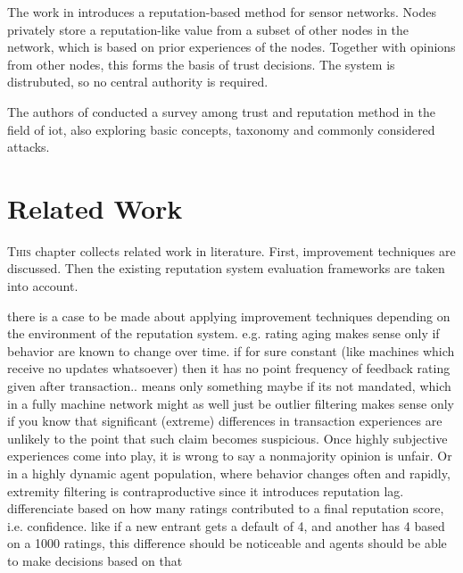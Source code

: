 \documentclass[%
    ]{\PathToTumTemplate/thesis/tum_thesis}
\begin{document}
The work in \cite{ganeriwal_reputation-based_2008} introduces a reputation-based method for sensor networks.
Nodes privately store a reputation-like value from a subset of other nodes in the network, which is based on prior experiences of the nodes.
Together with opinions from other nodes, this forms the basis of trust decisions.
The system is distrubuted, so no central authority is required.

The authors of \cite{ahmed_trust_2019} conducted a survey among trust and reputation method in the field of \gls{iot}, also exploring basic concepts, taxonomy and commonly considered attacks.




\chapter{Related Work}\label{chap:related_work}


\lettrine{T}{his} chapter collects related work in literature.
First, improvement techniques are discussed.
Then the existing reputation system evaluation frameworks are taken into account.




\iffalse
there is a case to be made about applying improvement techniques depending on the environment of the reputation system. e.g.
rating aging makes sense only if behavior are known to change over time. if for sure constant (like machines which receive no updates whatsoever) then it has no point
frequency of feedback rating given after transaction.. means only something maybe if its not mandated, which in a fully machine network might as well just be
outlier filtering makes sense only if you know that significant (extreme) differences in transaction experiences are unlikely to the point that such claim becomes suspicious. Once highly subjective experiences come into play, it is wrong to say a nonmajority opinion is unfair. Or in a highly dynamic agent population, where behavior changes often and rapidly, extremity filtering is contraproductive since it introduces reputation lag.
differenciate based on how many ratings contributed to a final reputation score, i.e. confidence. like if a new entrant gets a default of 4, and another has 4 based on a 1000 ratings, this difference should be noticeable and agents should be able to make decisions based on that
\end{document}
